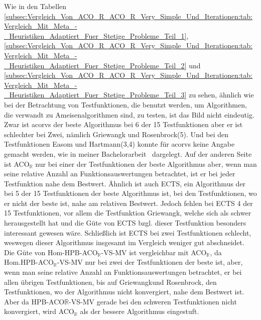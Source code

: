 \documentclass[fontsize=12, a4aper]{scrartcl}
\begin{document}
	Wie in den Tabellen \ref{subsec:Vergleich_Von_ACO_R_ACO_R_Very_Simple_Und_Iterationen:tab:Vergleich_Mit_Meta_-_Heuristiken_Adaptiert_Fuer_Stetige_Probleme_Teil_1}, \ref{subsec:Vergleich_Von_ACO_R_ACO_R_Very_Simple_Und_Iterationen:tab:Vergleich_Mit_Meta_-_Heuristiken_Adaptiert_Fuer_Stetige_Probleme_Teil_2} und \ref{subsec:Vergleich_Von_ACO_R_ACO_R_Very_Simple_Und_Iterationen:tab:Vergleich_Mit_Meta_-_Heuristiken_Adaptiert_Fuer_Stetige_Probleme_Teil_3} zu sehen, ähnlich wie bei der Betrachtung von Testfunktionen, die benutzt werden, um Algorithmen, die verwandt zu Ameisenalgorithmen sind, zu testen, ist das Bild nicht eindeutig. Zwar ist \ac{acorvs} der beste Algorithmus bei 6 der 15 Testfunktionen aber er ist schlechter bei Zwei, nämlich \glqq Griewangk\grqq{} und \glqq Rosenbrock(5)\grqq. Und bei den Testfunktionen \glqq Easom\grqq{} und \glqq Hartmann(3,4)\grqq{} konnte für \ac{acorvs} keine Angabe gemacht werden, wie in meiner Bachelorarbeit~\cite{FCM_2019} dargelegt. Auf der anderen Seite ist ACO\(_\mathbb{R}\) nur bei einer der Testfunktionen der beste Algorithmus aber, wenn man seine relative Anzahl an Funktionsauswertungen betrachtet, ist er bei jeder Testfunktion nahe dem Bestwert. Ähnlich ist auch ECTS, ein Algorithmus der bei 5 der 15 Testfunktionen der beste Algorithmus ist, bei den Testfunktionen, wo er nicht der beste ist, nahe am relativen Bestwert. Jedoch fehlen bei ECTS 4 der 15 Testfunktionen, vor allem die Testfunktion \glqq Griewangk\grqq{}, welche sich als schwer herausgestellt hat und die Güte von ECTS bzgl. dieser Testfunktion besonders interessant gewesen wäre. Schließlich ist ECTS bei zwei Testfunktionen schlecht, weswegen dieser Algorithmus insgesamt im Vergleich weniger gut abschneidet. Die Güte von Hom-HPB-ACO\(_\mathbb{R}\)-VS-MV ist vergleichbar mit ACO\(_\mathbb{R}\), da Hom.HPB-ACO\(_\mathbb{R}\)-VS-MV nur bei zwei der Testfunktionen der beste ist, aber, wenn man seine relative Anzahl an Funktionsauswertungen betrachtet, er bei allen übrigen Testfunktionen, bis auf \glqq Griewangk\grqq und \glqq Rosenbrock\grqq{}, den Testfunktionen, wo der Algorithmus nicht konvergiert, nahe dem Bestwert ist. Aber da HPB-ACO\(\mathbb{R}\)-VS-MV gerade bei den schweren Testfunktionen nicht konvergiert, wird ACO\(_\mathbb{R}\) als der bessere Algorithmus eingestuft.\hfill\newline
	
\end{document}
